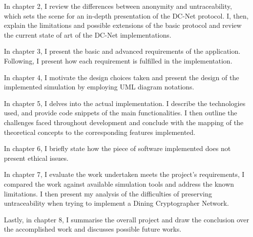 In chapter 2, I review the differences between anonymity and untraceability, which sets the scene for an in-depth presentation of the DC-Net protocol. I, then, explain the limitations and possible extensions of the basic protocol and review the current state of art of the DC-Net implementations.

In chapter 3, I present the basic and advanced requirements of the application. Following, I present how each requirement is fulfilled in the implementation. 

In chapter 4, I motivate the design choices taken and present the design of the implemented simulation by employing UML diagram notations.

In chapter 5, I delves into the actual implementation. I describe the technologies used, and provide code snippets of the main functionalities. I then outline the challenges faced throughout development and conclude with the mapping of the theoretical concepts to the corresponding features implemented.

In chapter 6, I briefly state how the piece of software implemented does not present ethical issues.

In chapter 7, I evaluate the work undertaken meets the project's requirements, I compared the work against available simulation tools and address the known limitations. I then present my analysis of the difficulties of preserving untraceability when trying to implement a Dining Cryptographer Network.

Lastly, in chapter 8, I summarise the overall project and draw the conclusion over the accomplished work and discusses possible future works.